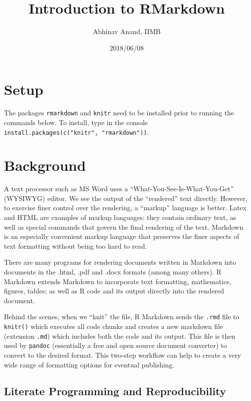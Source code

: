 \documentclass[11pt,]{article}
\title{Introduction to RMarkdown}
\author{Abhinav Anand, IIMB}
\date{2018/06/08}
\begin{document}
\maketitle

\section{Setup}\label{setup}

The packages \texttt{rmarkdown} and \texttt{knitr} need to be installed
prior to running the commands below. To install, type in the console
\texttt{install.packages(c("knitr",\ "rmarkdown"))}.

\section{Background}\label{background}

A text processor such as MS Word uses a ``What-You-See-Is-What-You-Get''
(WYSIWYG) editor. We see the output of the ``rendered'' text directly.
However, to exercise finer control over the rendering, a ``markup''
language is better. Latex and HTML are examples of markup languages:
they contain ordinary text, as well as special commands that govern the
final rendering of the text. Markdown is an especially convenient markup
language that preserves the finer aspects of text formatting without
being too hard to read.

There are many programs for rendering documents written in Markdown into
documents in the .html, .pdf and .docx formats (among many others). R
Markdown extends Markdown to incorporate text formatting, mathematics,
figures, tables; as well as R code and its output directly into the
rendered document.

Behind the scenes, when we ``knit'' the file, R Markdown sends the
\texttt{.rmd} file to \texttt{knitr()} which executes all code chunks
and creates a new markdown file (extension \texttt{.md}) which includes
both the code and its output. This file is then used by \texttt{pandoc}
(essentially a free and open source document converter) to convert to
the desired format. This two-step workflow can help to create a very
wide range of formatting options for eventual publishing.

\subsection{Literate Programming and
Reproducibility}\label{literate-programming-and-reproducibility}
\end{document}
